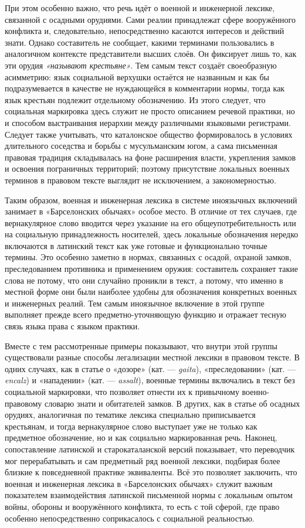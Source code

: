 При этом особенно важно, что речь идёт о военной и инженерной лексике, связанной с осадными орудиями. Сами реалии принадлежат сфере вооружённого конфликта и, следовательно, непосредственно касаются интересов и действий знати. Однако составитель не сообщает, какими терминами пользовались в аналогичном контексте представители высших слоёв. Он фиксирует лишь то, как эти орудия \emph{«называют крестьяне»}. Тем самым текст создаёт своеобразную асимметрию: язык социальной верхушки остаётся не названным и как бы подразумевается в качестве не нуждающейся в комментарии нормы, тогда как язык крестьян подлежит отдельному обозначению. Из этого следует, что социальная маркировка здесь служит не просто описанием речевой практики, но и способом выстраивания иерархии между различными языковыми регистрами. Следует также учитывать, что каталонское общество формировалось в условиях длительного соседства и борьбы с мусульманским югом, а сама письменная правовая традиция складывалась на фоне расширения власти, укрепления замков и освоения пограничных территорий; поэтому присутствие локальных военных терминов в правовом тексте выглядит не исключением, а закономерностью.

Таким образом, военная и инженерная лексика в системе иноязычных включений занимает в «Барселонских обычаях» особое место. В отличие от тех случаев, где вернакулярное слово вводится через указание на его общеупотребительность или на социальную принадлежность носителей, здесь локальные обозначения нередко включаются в латинский текст как уже готовые и функционально точные термины. Это особенно заметно в нормах, связанных с осадой, охраной замков, преследованием противника и применением оружия: составитель сохраняет такие слова не потому, что они случайно проникли в текст, а потому, что именно в местной форме они были наиболее удобны для обозначения конкретных военных и инженерных реалий. Тем самым иноязычное включение в этой группе выполняет прежде всего предметно-уточняющую функцию и отражает тесную связь языка права с языком практики.

Вместе с тем рассмотренные примеры показывают, что внутри этой группы существовали разные способы легализации местной лексики в правовом тексте. В одних случаях, как в статье о «дозоре» (кат. --- \emph{gaita}), «преследовании» (кат. --- \emph{encalz}) и «нападении» (кат. --- \emph{assalt}), военные термины включались в текст без социальной маркировки, что позволяет отнести их к привычному военно-правовому словарю знати и обитателей замков. В других, как в статье об осадных орудиях, аналогичная по тематике лексика специально приписывается крестьянам, и тогда вернакулярное слово выступает уже не только как предметное обозначение, но и как социально маркированная речь. Наконец, сопоставление латинской и старокаталанской версий показывает, что переводчик мог перерабатывать и сам предметный ряд военной лексики, подбирая более близкие к повседневной практике эквиваленты. Всё это позволяет заключить, что военная и инженерная лексика в «Барселонских обычаях» служит важным показателем взаимодействия латинской письменной нормы с локальным опытом войны, обороны и вооружённого конфликта, то есть с той сферой, где право особенно непосредственно соприкасалось с социальной реальностью.

